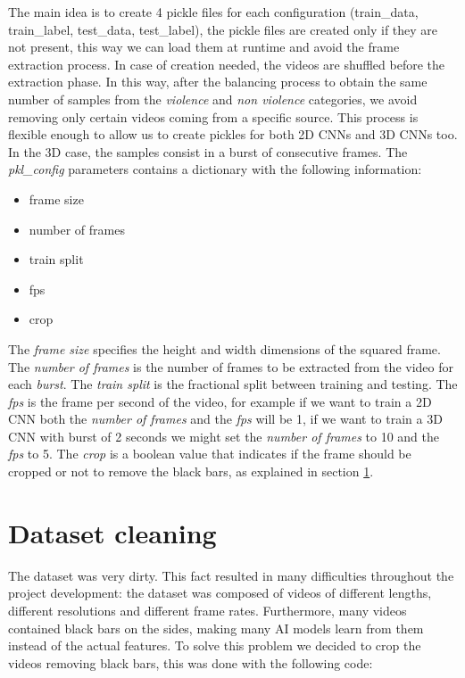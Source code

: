 The main idea is to create 4 pickle files for each configuration (train\_data, train\_label, test\_data, test\_label), the pickle files are created only if they are not present, this way we can load them at runtime and avoid the frame extraction process. In case of creation needed, the videos are shuffled before the extraction phase. In this way, after the balancing process to obtain the same number of samples from the \textit{violence} and \textit{non violence} categories, we avoid removing only certain videos coming from a specific source. This process is flexible enough to allow us to create pickles for both 2D CNNs and 3D CNNs too. In the 3D case, the samples consist in a burst of consecutive frames. The \textit{pkl\_config} parameters contains a dictionary with the following information:
\begin{itemize}
	\item frame size
	\item number of frames
	\item train split
	\item fps
	\item crop
\end{itemize}
The \textit{frame size} specifies the height and width dimensions of the squared frame. The \textit{number of frames} is the number of frames to be extracted from the video for each \textit{burst}. The \textit{train split} is the fractional split between training and testing. The \textit{fps} is the frame per second of the video, for example if we want to train a 2D CNN both the \textit{number of frames} and the \textit{fps} will be 1, if we want to train a 3D CNN with burst of 2 seconds we might set the \textit{number of frames} to 10 and the \textit{fps} to 5. The \textit{crop} is a boolean value that indicates if the frame should be cropped or not to remove the black bars, as explained in section \ref{sec:datasetcleaning}.

\section{Dataset cleaning}
\label{sec:datasetcleaning}
The dataset was very dirty. This fact resulted in many difficulties throughout the project development: the dataset was composed of videos of different lengths, different resolutions and different frame rates. Furthermore, many videos contained black bars on the sides, making many AI models learn from them instead of the actual features. To solve this problem we decided to crop the videos removing black bars, this was done with the following code:

